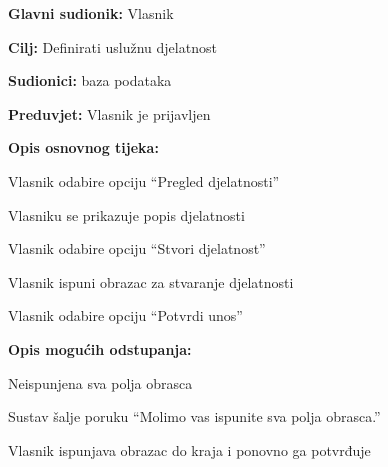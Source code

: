 			\begin{packed_item}
				\item \textbf{Glavni sudionik: } Vlasnik
				\item  \textbf{Cilj:} Definirati uslužnu djelatnost
				\item  \textbf{Sudionici:} baza podataka
				\item  \textbf{Preduvjet:} Vlasnik je prijavljen
				\item  \textbf{Opis osnovnog tijeka:}
				\item[] \begin{packed_enum}
					\item Vlasnik odabire opciju “Pregled djelatnosti”
					\item Vlasniku se prikazuje popis djelatnosti
					\item Vlasnik odabire opciju “Stvori djelatnost”
					\item Vlasnik ispuni obrazac za stvaranje djelatnosti
					\item Vlasnik odabire opciju “Potvrdi unos”
				\end{packed_enum}
				\item  \textbf{Opis mogućih odstupanja:}
				\item[] \begin{packed_item}
					\item[4.a] Neispunjena sva polja obrasca
					\item[] \begin{packed_enum}
						\item Sustav šalje poruku “Molimo vas ispunite sva polja obrasca.”
						\item Vlasnik ispunjava obrazac do kraja i ponovno ga potvrđuje
					\end{packed_enum}
				\end{packed_item}
			\end{packed_item}
			\noindent {}
